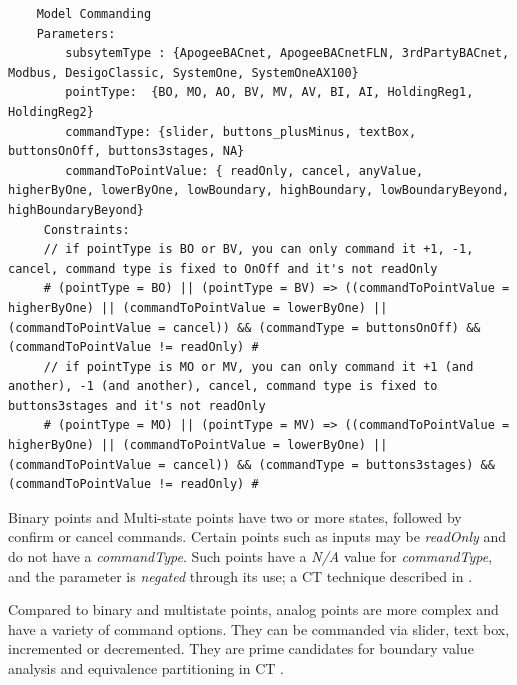 \documentclass[conference]{IEEEtran}
\begin{document}
	\begin{lstlisting}
	Model Commanding
	Parameters:
		subsytemType : {ApogeeBACnet, ApogeeBACnetFLN, 3rdPartyBACnet, Modbus, DesigoClassic, SystemOne, SystemOneAX100}
		pointType:  {BO, MO, AO, BV, MV, AV, BI, AI, HoldingReg1, HoldingReg2}  
		commandType: {slider, buttons_plusMinus, textBox, buttonsOnOff, buttons3stages, NA}
		commandToPointValue: { readOnly, cancel, anyValue, higherByOne, lowerByOne, lowBoundary, highBoundary, lowBoundaryBeyond, highBoundaryBeyond}			
	 Constraints:
	 // if pointType is BO or BV, you can only command it +1, -1, cancel, command type is fixed to OnOff and it's not readOnly
	 # (pointType = BO) || (pointType = BV) => ((commandToPointValue = higherByOne) || (commandToPointValue = lowerByOne) || (commandToPointValue = cancel)) && (commandType = buttonsOnOff) && (commandToPointValue != readOnly) # 
	 // if pointType is MO or MV, you can only command it +1 (and another), -1 (and another), cancel, command type is fixed to buttons3stages and it's not readOnly
	 # (pointType = MO) || (pointType = MV) => ((commandToPointValue = higherByOne) || (commandToPointValue = lowerByOne) || (commandToPointValue = cancel)) && (commandType = buttons3stages) && (commandToPointValue != readOnly) # 
	\end{lstlisting}

	Binary points and Multi-state points have two or more states, followed by confirm or cancel commands. 
	Certain points such as inputs may be \textit{readOnly} and do not have a \textit{commandType}. Such points have a \textit{N/A} value for \textit{commandType}, and the parameter is \textit{negated} through its use; a CT technique described in \cite{segall2012common}.	

	Compared to binary and multistate points, analog points are more complex and have a variety of command options.
	They can be commanded via slider, text box, incremented or decremented. 
	They are prime candidates for boundary value analysis and equivalence partitioning in CT \cite{segall2012common}.
\end{document}
